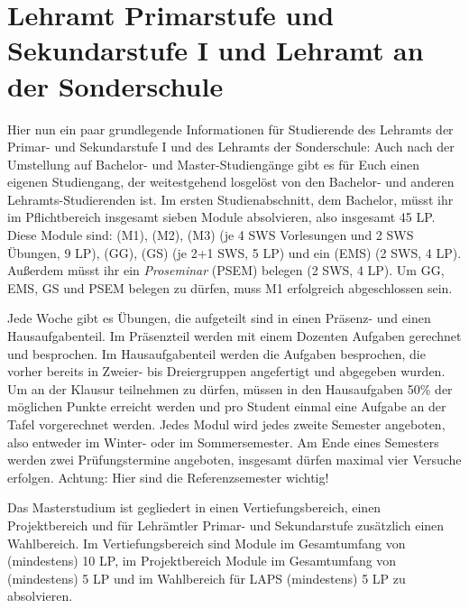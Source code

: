 \section{Lehramt Primarstufe und Sekundarstufe I und Lehramt an der
Sonderschule}

Hier nun ein paar grundlegende Informationen für Studierende des Lehramts der
Primar- und Sekundarstufe I und des Lehramts der Sonderschule: Auch nach der
Umstellung auf Bachelor- und Master-Studiengänge gibt es für Euch einen eigenen
Studiengang, der weitestgehend losgelöst von den Bachelor- und anderen
Lehramts-Studierenden ist. Im ersten Studienabschnitt, dem Bachelor, müsst ihr
im Pflichtbereich insgesamt sieben Module absolvieren, also insgesamt 45 LP.
Diese Module sind:  (M1),  (M2),  (M3) (je 4 SWS Vorlesungen
und 2 SWS Übungen, 9 LP),  (GG),
 (GS) (je 2+1 SWS, 5 LP) und ein
 (EMS) (2 SWS, 4 LP). Außerdem müsst ihr ein
\emph{Proseminar} (PSEM) belegen (2 SWS, 4 LP). Um GG, EMS, GS und PSEM belegen
zu dürfen, muss M1 erfolgreich abgeschlossen sein.

Jede Woche gibt es Übungen, die aufgeteilt sind in einen Präsenz- und einen
Hausaufgabenteil. Im Präsenzteil werden mit einem Dozenten Aufgaben gerechnet
und besprochen. Im Hausaufgabenteil werden die Aufgaben besprochen, die vorher
bereits in Zweier- bis Dreiergruppen angefertigt und abgegeben wurden.  Um an
der Klausur teilnehmen zu dürfen, müssen in den Hausaufgaben 50\% der möglichen
Punkte erreicht werden und pro Student einmal eine Aufgabe an der Tafel
vorgerechnet werden. Jedes Modul wird jedes zweite Semester angeboten, also
entweder im Winter- oder im Sommersemester. Am Ende eines Semesters werden zwei
Prüfungstermine angeboten, insgesamt dürfen maximal vier Versuche erfolgen.
Achtung: Hier sind die Referenzsemester wichtig!

Das Masterstudium ist gegliedert in einen Vertiefungsbereich, einen
Projektbereich und für Lehrämtler Primar- und Sekundarstufe zusätzlich einen
Wahlbereich. Im Vertiefungsbereich sind Module im Gesamtumfang von (mindestens)
10 LP, im Projektbereich Module im Gesamtumfang von (mindestens) 5 LP und im
Wahlbereich für LAPS (mindestens) 5 LP zu absolvieren. 


